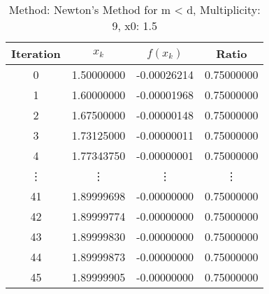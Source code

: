 \begin{table}
\centering
\caption{Method: Newton's Method for m < d, Multiplicity: 9, x0: 1.5}
\label{tab:table_Newton's_Method_for_m_<_d_9_1_5}
\begin{tabular}{c c c c}
\toprule
Iteration &      $x_k$ &    $f(x_k)$ &      Ratio \\
\midrule
        0 & 1.50000000 & -0.00026214 & 0.75000000 \\
        1 & 1.60000000 & -0.00001968 & 0.75000000 \\
        2 & 1.67500000 & -0.00000148 & 0.75000000 \\
        3 & 1.73125000 & -0.00000011 & 0.75000000 \\
        4 & 1.77343750 & -0.00000001 & 0.75000000 \\
   \vdots &     \vdots &      \vdots &     \vdots \\
       41 & 1.89999698 & -0.00000000 & 0.75000000 \\
       42 & 1.89999774 & -0.00000000 & 0.75000000 \\
       43 & 1.89999830 & -0.00000000 & 0.75000000 \\
       44 & 1.89999873 & -0.00000000 & 0.75000000 \\
       45 & 1.89999905 & -0.00000000 & 0.75000000 \\
\bottomrule
\end{tabular}
\end{table}
